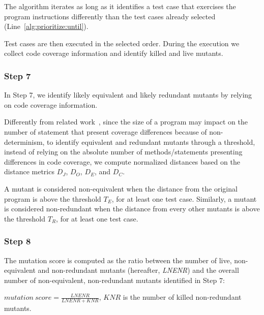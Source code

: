 The algorithm iterates as long as it identifies a test case that exercises 
the program instructions differently than the test cases already selected (Line~\ref{alg:prioritize:until}).

Test cases are then executed in the selected order. During the execution we collect code coverage information and identify killed and live mutants.



\subsubsection{Step 7}


In Step 7, we identify likely equivalent and likely redundant mutants by relying on code coverage information.

Differently from related work~\cite{schuler2013covering}, since the size of a program may impact on the number of statement that present coverage differences because of non-determinism, 
to identify equivalent and redundant mutants through a threshold, instead of relying on the absolute number of methods/statements presenting differences in code coverage, we compute normalized distances based on the distance metrics $D_J$, $D_O$, $D_E$, and $D_C$. 

A mutant is considered non-equivalent when the distance from the original program is above the threshold $T_E$, for at least one test case.
Similarly, a mutant is considered non-redundant when the distance from every other mutants is above the threshold $T_R$, for at least one test case.

\subsubsection{Step 8}

The mutation score is computed as the ratio between the number of live, non-equivalent and non-redundant mutants (hereafter, \emph{LNENR}) and the overall number of non-equivalent, non-redundant mutants identified in Step 7:

$\mathit{mutation}\ \mathit{score} = \frac{\mathit{LNENR}}{\mathit{LNENR}+\mathit{KNR}}$,
$\mathit{KNR}$ is the number of killed non-redundant mutants.

%
%
%
